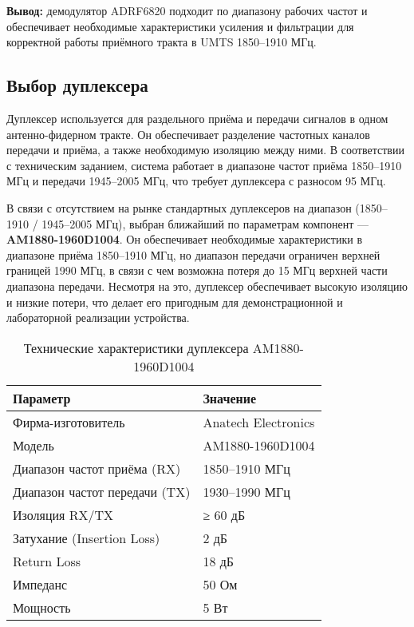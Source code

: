 \documentclass[a4paper,12pt]{article}
\begin{document}
\textbf{Вывод:} демодулятор ADRF6820 подходит по диапазону рабочих частот и обеспечивает необходимые характеристики усиления и фильтрации для корректной работы приёмного тракта в UMTS 1850–1910 МГц.

\subsection{Выбор дуплексера}

Дуплексер используется для раздельного приёма и передачи сигналов в одном антенно-фидерном тракте. Он обеспечивает разделение частотных каналов передачи и приёма, а также необходимую изоляцию между ними. В соответствии с техническим заданием, система работает в диапазоне частот приёма 1850–1910 МГц и передачи 1945–2005 МГц, что требует дуплексера с разносом 95 МГц.

В связи с отсутствием на рынке стандартных дуплексеров на диапазон (1850–1910 / 1945–2005 МГц), выбран ближайший по параметрам компонент — \textbf{AM1880-1960D1004}. Он обеспечивает необходимые характеристики в диапазоне приёма 1850–1910 МГц, но диапазон передачи ограничен верхней границей 1990 МГц, в связи с чем возможна потеря до 15 МГц верхней части диапазона передачи. Несмотря на это, дуплексер обеспечивает высокую изоляцию и низкие потери, что делает его пригодным для демонстрационной и лабораторной реализации устройства.

\begin{table}[H]
\centering
\caption{Технические характеристики дуплексера AM1880-1960D1004}
\begin{tabular}{|l|l|}
\hline
\textbf{Параметр} & \textbf{Значение} \\ \hline
Фирма-изготовитель & Anatech Electronics \\ \hline
Модель & AM1880-1960D1004 \\ \hline
Диапазон частот приёма (RX) & 1850–1910 МГц \\ \hline
Диапазон частот передачи (TX) & 1930–1990 МГц \\ \hline
Изоляция RX/TX & ≥ 60 дБ \\ \hline
Затухание (Insertion Loss) & 2 дБ \\ \hline
Return Loss & 18 дБ \\ \hline
Импеданс & 50 Ом \\ \hline
Мощность & 5 Вт \\ \hline
\end{tabular}
\end{table}
\end{document}
